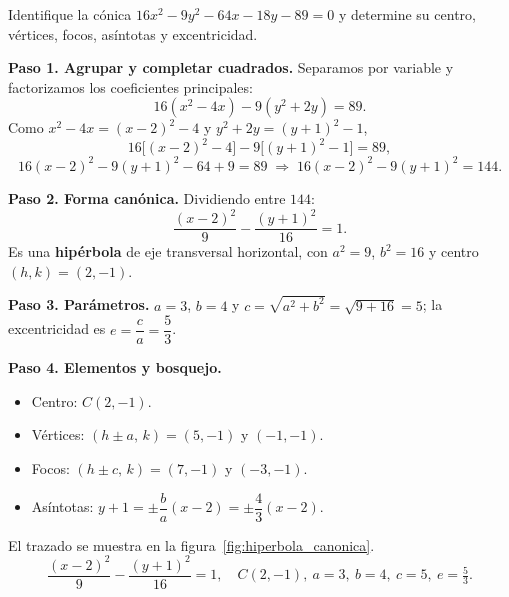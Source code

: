 \begin{prob}
Identifique la cónica $16x^2-9y^2-64x-18y-89=0$ y determine su centro,
vértices, focos, asíntotas y excentricidad.
\begin{myproof}
\textbf{Paso 1. Agrupar y completar cuadrados.} Separamos por variable y
factorizamos los coeficientes principales:
\[
  16(x^2-4x)-9(y^2+2y)=89.
\]
Como $x^2-4x=(x-2)^2-4$ y $y^2+2y=(y+1)^2-1$,
\[
  16\bigl[(x-2)^2-4\bigr]-9\bigl[(y+1)^2-1\bigr]=89,
\]
\[
  16(x-2)^2-9(y+1)^2-64+9=89
  \;\Longrightarrow\;
  16(x-2)^2-9(y+1)^2=144.
\]

\textbf{Paso 2. Forma canónica.} Dividiendo entre $144$:
\[
  \frac{(x-2)^2}{9}-\frac{(y+1)^2}{16}=1.
\]
Es una \textbf{hipérbola} de eje transversal horizontal, con $a^2=9$,
$b^2=16$ y centro $(h,k)=(2,-1)$.

\textbf{Paso 3. Parámetros.} $a=3$, $b=4$ y
$c=\sqrt{a^2+b^2}=\sqrt{9+16}=5$; la excentricidad es
$e=\dfrac{c}{a}=\dfrac{5}{3}$.

\textbf{Paso 4. Elementos y bosquejo.}
\begin{itemize}
  \item Centro: $C(2,-1)$.
  \item Vértices: $(h\pm a,\,k)=(5,-1)$ y $(-1,-1)$.
  \item Focos: $(h\pm c,\,k)=(7,-1)$ y $(-3,-1)$.
  \item Asíntotas: $y+1=\pm\dfrac{b}{a}(x-2)=\pm\dfrac{4}{3}(x-2)$.
\end{itemize}
El trazado se muestra en la figura~\ref{fig:hiperbola_canonica}.
\[
  \boxed{\ \frac{(x-2)^2}{9}-\frac{(y+1)^2}{16}=1,\quad
  C(2,-1),\ a=3,\ b=4,\ c=5,\ e=\tfrac53.\ }
\]
\end{myproof}
\end{prob}


